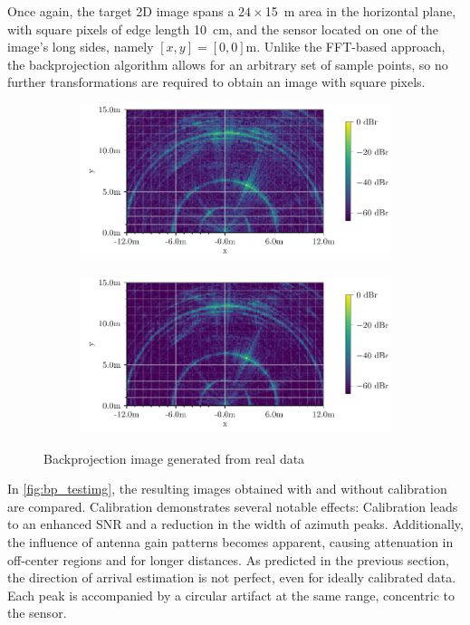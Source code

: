 Once again, the target 2D image spans a $24 \times$\SI{15}{\m} area in the horizontal plane,
with square pixels of edge length \SI{10}{\cm},
and the sensor located on one of the image's long sides, namely $[x,y] = [0,0]$m.
Unlike the FFT-based approach,
the backprojection algorithm allows for an arbitrary set of sample points,
so no further transformations are required to obtain an image with square pixels.\\
\begin{figure}[t]
    \centering
    \begin{subfigure}{0.8\textwidth}
        \includegraphics[width=\textwidth]{../figures/testimg_uncalibrated_bp.pdf}
    \end{subfigure}
    \begin{subfigure}{0.8\textwidth}
        \includegraphics[width=\textwidth]{../figures/testimg_calibrated_bp.pdf}
    \end{subfigure}
    \caption{Backprojection image generated from real data}
    \label{fig:bp_testimg}
\end{figure}
In \autoref{fig:bp_testimg}, the resulting images obtained with and without calibration are compared.
Calibration demonstrates several notable effects:
Calibration leads to an enhanced SNR and a reduction in the width of azimuth peaks.
Additionally, the influence of antenna gain patterns becomes apparent,
causing attenuation in off-center regions and for longer distances.
As predicted in the previous section,
the direction of arrival estimation is not perfect, even for ideally calibrated data.
Each peak is accompanied by a circular artifact at the same range, concentric to the sensor.

